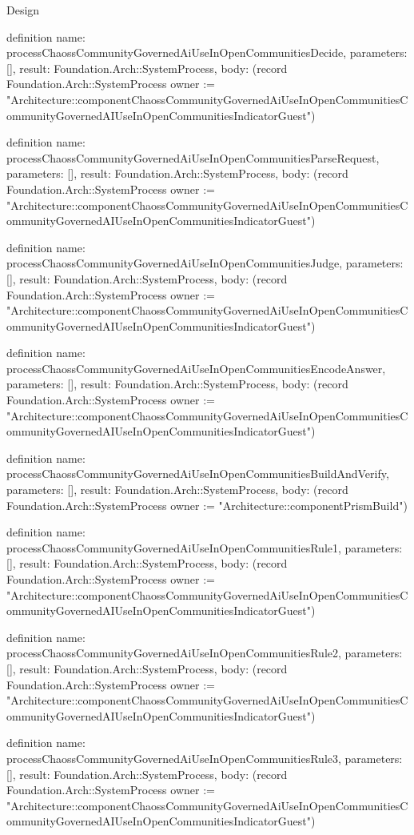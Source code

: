 \begin{lexlean}{Design}
\begin{semanticmodule}
definition{
  name: processChaossCommunityGovernedAiUseInOpenCommunitiesDecide,
  parameters: [],
  result: Foundation.Arch::SystemProcess,
  body: (record Foundation.Arch::SystemProcess {owner := "Architecture::componentChaossCommunityGovernedAiUseInOpenCommunitiesCommunityGovernedAIUseInOpenCommunitiesIndicatorGuest"})
}

definition{
  name: processChaossCommunityGovernedAiUseInOpenCommunitiesParseRequest,
  parameters: [],
  result: Foundation.Arch::SystemProcess,
  body: (record Foundation.Arch::SystemProcess {owner := "Architecture::componentChaossCommunityGovernedAiUseInOpenCommunitiesCommunityGovernedAIUseInOpenCommunitiesIndicatorGuest"})
}

definition{
  name: processChaossCommunityGovernedAiUseInOpenCommunitiesJudge,
  parameters: [],
  result: Foundation.Arch::SystemProcess,
  body: (record Foundation.Arch::SystemProcess {owner := "Architecture::componentChaossCommunityGovernedAiUseInOpenCommunitiesCommunityGovernedAIUseInOpenCommunitiesIndicatorGuest"})
}

definition{
  name: processChaossCommunityGovernedAiUseInOpenCommunitiesEncodeAnswer,
  parameters: [],
  result: Foundation.Arch::SystemProcess,
  body: (record Foundation.Arch::SystemProcess {owner := "Architecture::componentChaossCommunityGovernedAiUseInOpenCommunitiesCommunityGovernedAIUseInOpenCommunitiesIndicatorGuest"})
}

definition{
  name: processChaossCommunityGovernedAiUseInOpenCommunitiesBuildAndVerify,
  parameters: [],
  result: Foundation.Arch::SystemProcess,
  body: (record Foundation.Arch::SystemProcess {owner := "Architecture::componentPrismBuild"})
}

definition{
  name: processChaossCommunityGovernedAiUseInOpenCommunitiesRule1,
  parameters: [],
  result: Foundation.Arch::SystemProcess,
  body: (record Foundation.Arch::SystemProcess {owner := "Architecture::componentChaossCommunityGovernedAiUseInOpenCommunitiesCommunityGovernedAIUseInOpenCommunitiesIndicatorGuest"})
}

definition{
  name: processChaossCommunityGovernedAiUseInOpenCommunitiesRule2,
  parameters: [],
  result: Foundation.Arch::SystemProcess,
  body: (record Foundation.Arch::SystemProcess {owner := "Architecture::componentChaossCommunityGovernedAiUseInOpenCommunitiesCommunityGovernedAIUseInOpenCommunitiesIndicatorGuest"})
}

definition{
  name: processChaossCommunityGovernedAiUseInOpenCommunitiesRule3,
  parameters: [],
  result: Foundation.Arch::SystemProcess,
  body: (record Foundation.Arch::SystemProcess {owner := "Architecture::componentChaossCommunityGovernedAiUseInOpenCommunitiesCommunityGovernedAIUseInOpenCommunitiesIndicatorGuest"})
}


\end{semanticmodule}
\end{lexlean}
